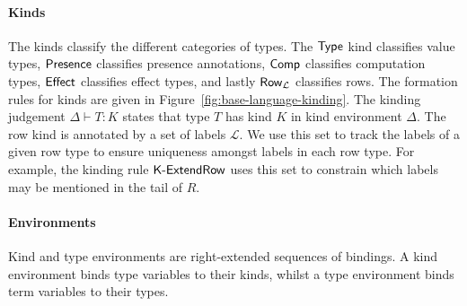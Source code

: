\documentclass[12pt,phd,lfcs,twoside,openright,logo,leftchapter,normalheadings]{infthesis}
\theoremstyle{plain}
\theoremstyle{definition}
\begin{document}
\paragraph{Kinds}
The kinds classify the different categories of types. The $\mathsf{Type}$ kind
classifies value types, $\mathsf{Presence}$ classifies presence annotations,
$\mathsf{Comp}$ classifies computation types, $\mathsf{Effect}$ classifies effect
types, and lastly $\mathsf{Row}_{\mathcal{L}}$ classifies rows.
%
The formation rules for kinds are given in
Figure~\ref{fig:base-language-kinding}. The kinding judgement
$\Delta \vdash T : K$ states that type $T$ has kind $K$ in kind
environment $\Delta$.
%
The row kind is annotated by a set of labels $\mathcal{L}$. We use
this set to track the labels of a given row type to ensure uniqueness
amongst labels in each row type. For example, the kinding rule
$\mathsf{K\textrm{-}ExtendRow}$ uses this set to constrain which labels may be
mentioned in the tail of $R$.%

\paragraph{Environments}
Kind and type environments are right-extended sequences of bindings. A
kind environment binds type variables to their kinds, whilst a type
environment binds term variables to their types.

\end{document}
